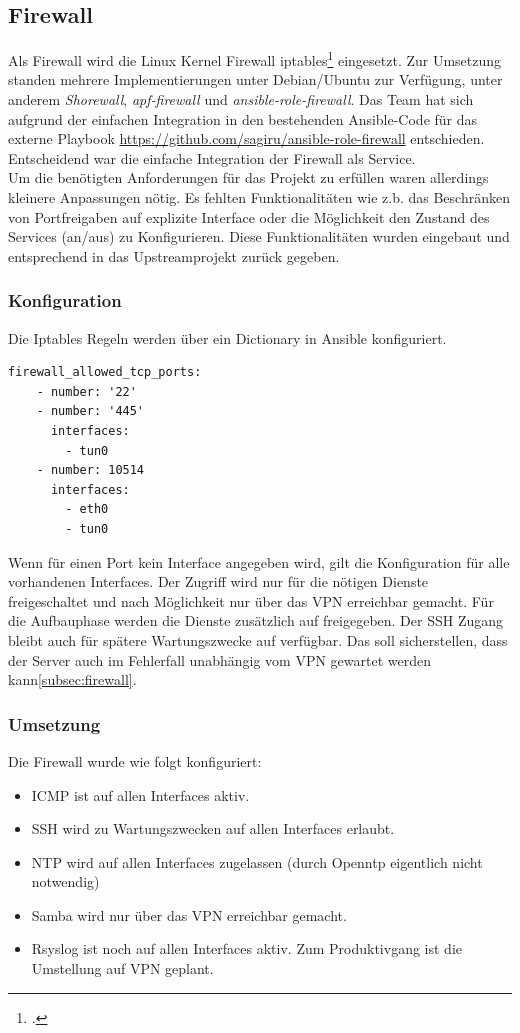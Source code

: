 \subsection{Firewall}
Als Firewall wird die Linux Kernel Firewall iptables\footcite{iptables} eingesetzt. Zur Umsetzung standen mehrere Implementierungen unter Debian/Ubuntu zur Verfügung, unter anderem \emph{Shorewall}, \emph{apf-firewall} und \emph{ansible-role-firewall}. Das Team hat sich aufgrund der einfachen Integration in den bestehenden Ansible-Code für das externe Playbook \url{https://github.com/sagiru/ansible-role-firewall} entschieden. Entscheidend war die einfache Integration der Firewall als Service. \\

Um die benötigten Anforderungen für das Projekt zu erfüllen waren allerdings kleinere Anpassungen nötig. Es fehlten  Funktionalitäten wie z.b. das Beschränken von Portfreigaben auf explizite Interface oder die Möglichkeit den Zustand des Services (an/aus) zu Konfigurieren. Diese Funktionalitäten wurden eingebaut und entsprechend in das Upstreamprojekt zurück gegeben.

\subsubsection{Konfiguration}
Die Iptables Regeln werden über ein Dictionary in Ansible konfiguriert.

\begin{lstlisting}[label=code:smbconf5,caption=Auszug aus der Datei ansible/group\_vars/file\_server\_sued/public]
  firewall_allowed_tcp_ports:
    - number: '22'
    - number: '445'
      interfaces:
        - tun0
    - number: 10514
      interfaces:
        - eth0
        - tun0
\end{lstlisting}

Wenn für einen Port kein Interface angegeben wird, gilt die Konfiguration für alle vorhandenen Interfaces. Der Zugriff wird nur für die nötigen Dienste freigeschaltet und nach Möglichkeit nur über das VPN erreichbar gemacht. Für die Aufbauphase werden die Dienste zusätzlich auf  freigegeben. Der SSH Zugang bleibt auch für spätere Wartungszwecke auf  verfügbar. Das soll sicherstellen, dass der Server auch im Fehlerfall unabhängig vom VPN gewartet werden kann\ref{subsec:firewall}.

\subsubsection{Umsetzung}
Die Firewall wurde wie folgt konfiguriert:
\begin{itemize}
\item ICMP ist auf allen Interfaces aktiv.
\item SSH wird zu Wartungszwecken auf allen Interfaces erlaubt.
\item NTP wird auf allen Interfaces zugelassen (durch Openntp eigentlich nicht notwendig)
\item Samba wird nur über das VPN erreichbar gemacht.
\item Rsyslog ist noch auf allen Interfaces aktiv. Zum Produktivgang ist die Umstellung auf VPN geplant.
\end{itemize}

